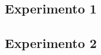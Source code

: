 \documentclass[../main.tex]{subfiles}
\begin{document}
\subsection{Experimento 1}

\subsection{Experimento 2}
\end{document}
